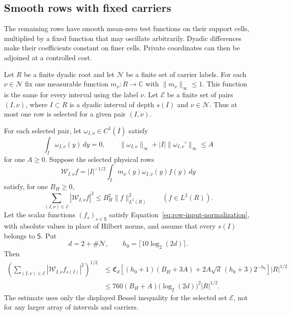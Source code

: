 \subsection{Smooth rows with fixed carriers}

The remaining rows have smooth mean-zero test functions on their
support cells, multiplied by a fixed function that may oscillate
arbitrarily.  Dyadic differences make their coefficients constant
on finer cells.  Private coordinates can then be adjoined at a
controlled cost.

\begin{lemma}
\label{lem:smooth-depth}
Let $R$ be a finite dyadic root and let $\mathcal N$ be a finite
set of carrier labels.  For each $\nu\in\mathcal N$ fix one
measurable function $m_\nu:R\to\mathbb C$ with
$\|m_\nu\|_\infty\le1$.  This function is the same for every
interval using the label $\nu$.  Let $\mathcal E$ be a finite
set of pairs $(I,\nu)$, where $I\subset R$ is a dyadic interval
of depth $s(I)$ and $\nu\in\mathcal N$.  Thus at most one row
is selected for a given pair $(I,\nu)$.

For each selected pair, let $\omega_{I,\nu}\in C^1(\overline I)$
satisfy
\[
 \int_I\omega_{I,\nu}(y)\,dy=0,\qquad
 \|\omega_{I,\nu}\|_\infty+
       |I|\|\omega_{I,\nu}'\|_\infty\le A
\]
for one $A\ge0$.  Suppose the selected physical rows
\[
 \mathcal W_{I,\nu}f
   =|I|^{-1/2}\int_I m_\nu(y)\omega_{I,\nu}(y)f(y)\,dy
\]
satisfy, for one $B_H\ge0$,
\[
 \sum_{(I,\nu)\in\mathcal E}|\mathcal W_{I,\nu}f|^2
 \le B_H^2\|f\|_{L^2(R)}^2\qquad(f\in L^2(R)).
\]
Let the scalar functions $(f_s)_{s\in\mathsf S}$ satisfy
Equation~\eqref{eq:row-input-normalization}, with absolute
values in place of Hilbert norms, and assume that every
$s(I)$ belongs to $\mathsf S$.  Put
\[
 d=2+\#\mathcal N,\qquad h_0=\lceil10\log_2(2d)\rceil.
\]
Then
\begin{equation}
 \begin{split}
 \left(\sum_{(I,\nu)\in\mathcal E}
           |\mathcal W_{I,\nu}f_{s(I)}|^2\right)^{1/2}
 &\le \mathfrak C_d\left[
       (h_0+1)(B_H+3A)
       +2A\sqrt d\,(h_0+3)2^{-h_0}\right]|R|^{1/2}\\
 &\le 760(B_H+A)\bigl(\log_2(2d)\bigr)^2|R|^{1/2}.
 \end{split}
 \label{eq:smooth-depth}
\end{equation}
The estimate uses only the displayed Bessel inequality for the
selected set $\mathcal E$, not for any larger array of intervals
and carriers.
\end{lemma}

